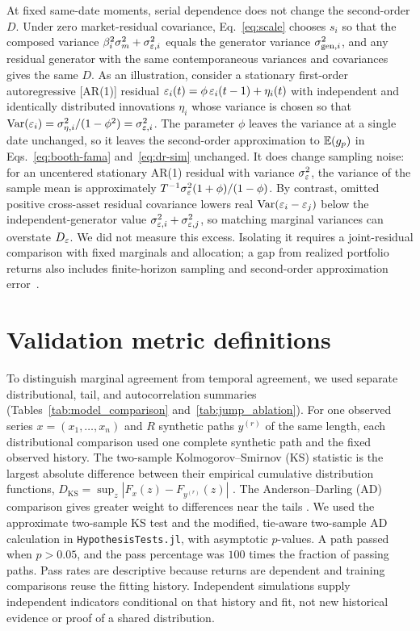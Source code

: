 At fixed same-date moments, serial dependence does not change the second-order $D$. Under zero market-residual covariance,
Eq.~\eqref{eq:scale} chooses $s_i$ so that the composed variance $\beta_i^2\sigma_m^2+\sigma_{\varepsilon,i}^2$ equals the
generator variance $\sigma_{\mathrm{gen},i}^2$, and any residual generator
with the same contemporaneous variances and covariances gives the same $D$. As an
illustration, consider a stationary first-order autoregressive
[AR(1)] residual $\varepsilon_i(t) = \phi\, \varepsilon_i(t-1) + \eta_i(t)$ with
independent and identically distributed innovations $\eta_i$ whose
variance is chosen so that
$\operatorname{Var}(\varepsilon_i) = \sigma_{\eta,i}^2 / (1 - \phi^2) = \sigma_{\varepsilon,i}^2$.
The parameter $\phi$ leaves the variance at a single date unchanged,
so it leaves the second-order approximation to $\mathbb{E}(g_p)$ in Eqs.~\eqref{eq:booth-fama} and~\eqref{eq:dr-sim} unchanged. It does change sampling noise: for an
uncentered stationary AR(1) residual with variance $\sigma_\varepsilon^2$,
the variance of the sample mean is approximately
$T^{-1}\sigma_\varepsilon^2(1+\phi)/(1-\phi)$.
By contrast, omitted positive cross-asset residual covariance lowers real $\operatorname{Var}(\varepsilon_i-\varepsilon_j)$ below the independent-generator value $\sigma_{\varepsilon,i}^2+\sigma_{\varepsilon,j}^2$, so matching marginal variances can overstate $D_\varepsilon$. We did not measure this excess. Isolating it requires a joint-residual comparison with fixed marginals and allocation; a gap from realized portfolio returns also includes finite-horizon sampling and second-order approximation error~\cite{boucheyNemtchinovWong2015}.

\section{Validation metric definitions}
\label{sec:supp-validation}

To distinguish marginal agreement from temporal agreement, we used
separate distributional, tail, and autocorrelation summaries
(Tables~\ref{tab:model_comparison} and~\ref{tab:jump_ablation}).
 For one observed series $x=(x_1,\ldots,x_n)$ and $R$ synthetic
paths $y^{(r)}$ of the same length, each distributional comparison
used one complete synthetic path and the fixed observed history.
The two-sample Kolmogorov--Smirnov (KS) statistic is the largest
absolute difference between their empirical cumulative distribution
functions, $D_{\mathrm{KS}}=\sup_z|F_x(z)-F_{y^{(r)}}(z)|$
\cite{kolmogorov1933,smirnov1948}. The Anderson--Darling (AD)
comparison gives greater weight to differences near the tails
\cite{andersonDarling1952}. We used the approximate two-sample KS
test and the modified, tie-aware two-sample AD calculation in
\texttt{HypothesisTests.jl}, with asymptotic $p$-values. A path
passed when $p>0.05$, and the pass percentage was $100$ times the
fraction of passing paths. Pass rates are descriptive because returns are dependent and training comparisons reuse the fitting history. Independent simulations supply independent indicators conditional on that history and fit, not new historical evidence or proof of a shared distribution.

